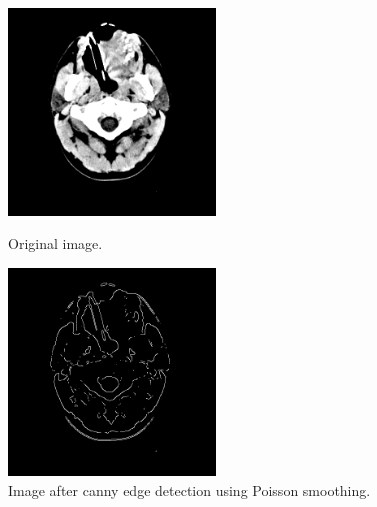 \documentclass[a4paper,11pt]{article}
\begin{document}
\begin{figure}[ht!]
    \begin{minipage}{0.5\textwidth}
        \centering
        \includegraphics[width=55mm]{0001.png}
        \caption{Original image.}
    \end{minipage}\hfill
    \begin{minipage}{0.5\textwidth}
        \centering
        \includegraphics[width=55mm]{0001_poisson.png}
        \caption{Image after canny edge detection using Poisson smoothing.}
    \end{minipage}\hfill
\end{figure}
\end{document}
